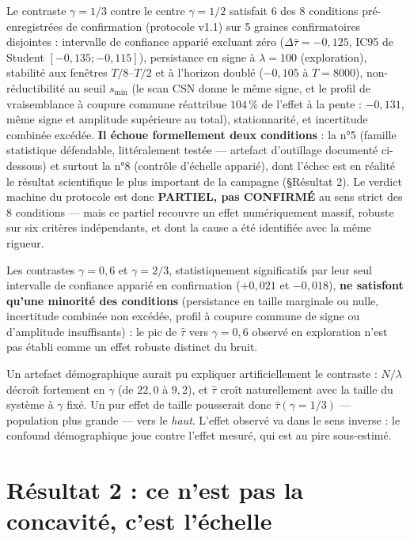 \documentclass[11pt,a4paper]{article}
\begin{document}
\medskip
Le contraste $\gamma=1/3$ contre le centre $\gamma=1/2$ satisfait 6 des 8
conditions pré-enregistrées de confirmation (protocole v1.1) sur 5
graines confirmatoires disjointes : intervalle de confiance apparié
excluant zéro ($\Delta\hat\tau=-0{,}125$, IC95 de Student
$[-0{,}135;-0{,}115]$), persistance en signe à $\lambda=100$
(exploration), stabilité aux fenêtres $T/8$--$T/2$ et à l'horizon doublé
($-0{,}105$ à $T=8000$), non-réductibilité au seuil $s_{\min}$ (le scan
CSN donne le même signe, et le profil de vraisemblance à coupure commune
réattribue $104\,\%$ de l'effet à la pente : $-0{,}131$, même signe et
amplitude supérieure au total), stationnarité, et incertitude combinée
excédée. \textbf{Il échoue formellement deux conditions} : la n°5
(famille statistique défendable, littéralement testée --- artefact
d'outillage documenté ci-dessous) et surtout la n°8 (contrôle d'échelle
apparié), dont l'échec est en réalité le résultat scientifique le plus
important de la campagne (§Résultat 2). Le verdict machine du protocole
est donc \textbf{PARTIEL, pas CONFIRMÉ} au sens strict des 8 conditions
--- mais ce \og partiel \fg{} recouvre un effet numériquement massif,
robuste sur six critères indépendants, et dont la cause a été identifiée
avec la même rigueur.

Les contrastes $\gamma=0{,}6$ et $\gamma=2/3$, statistiquement
significatifs par leur seul intervalle de confiance apparié en
confirmation ($+0{,}021$ et $-0{,}018$), \textbf{ne satisfont qu'une
minorité des conditions} (persistance en taille marginale ou nulle,
incertitude combinée non excédée, profil à coupure commune de signe ou
d'amplitude insuffisants) : le \og pic \fg{} de $\hat\tau$ vers
$\gamma=0{,}6$ observé en exploration n'est pas établi comme un effet
robuste distinct du bruit.

Un artefact démographique aurait pu expliquer artificiellement le
contraste : $N/\lambda$ décroît fortement en $\gamma$ (de $22{,}0$ à
$9{,}2$), et $\hat\tau$ croît naturellement avec la taille du système à
$\gamma$ fixé. Un pur effet de taille pousserait donc
$\hat\tau(\gamma=1/3)$ --- population plus grande --- vers le
\emph{haut}. L'effet observé va dans le sens inverse : le confound
démographique joue contre l'effet mesuré, qui est au pire sous-estimé.

\section{Résultat 2 : ce n'est pas la concavité, c'est l'échelle}
\end{document}
